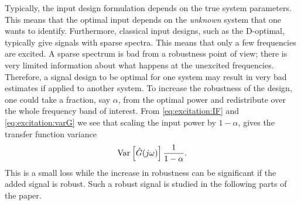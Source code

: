 Typically, the input design formulation depends on the true system parameters. This means that the optimal input depends on the \emph{unknown} system that one wants to identify. Furthermore, classical input designs, such as the D-optimal, typically give signals with sparse spectra. This means that only a few frequencies are excited. A sparse spectrum is bad from a robustness point of view; there is very limited information about what happens at the unexcited frequencies. Therefore, a signal design to be optimal for one system may result in very bad estimates if applied to another system. To increase the robustness of the design, one could take a fraction, say $\alpha$, from the optimal power and redistribute over the whole frequency band of interest. From \eqref{eq:excitation:IF} and \eqref{eq:excitation:varG} we see that scaling the input power by $1-\alpha$, gives the transfer function variance
\begin{align}
\operatorname{\mathrm{Var}}_{} \left[ \hat{G}(j\omega) \right]\frac{1}{1-\alpha}.
\end{align}
This is a small loss while the increase in robustness can be significant if the added signal is robust. Such a robust signal is studied in the following parts of the paper.


